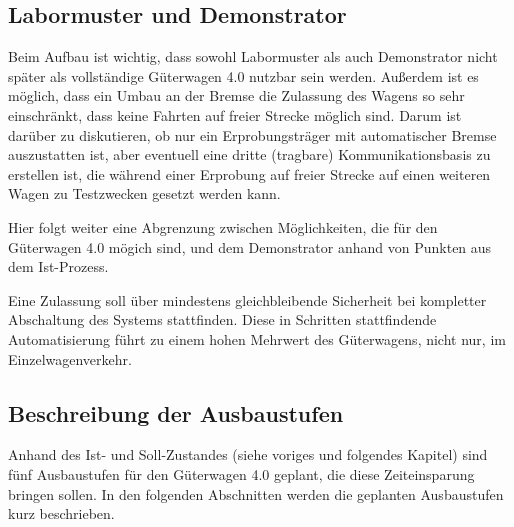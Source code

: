 \subsection{Labormuster und Demonstrator}
Beim Aufbau ist wichtig, dass sowohl Labormuster als auch Demonstrator nicht später als vollständige Güterwagen 4.0 nutzbar sein werden. Außerdem ist es möglich, dass ein Umbau an der Bremse die Zulassung des Wagens so sehr einschränkt, dass keine Fahrten auf freier Strecke möglich sind. Darum ist darüber zu diskutieren, ob nur ein Erprobungsträger mit automatischer Bremse auszustatten ist, aber eventuell eine dritte (tragbare) Kommunikationsbasis zu erstellen ist, die während einer Erprobung auf freier Strecke auf einen weiteren Wagen zu Testzwecken gesetzt werden kann.\par
Hier folgt weiter eine Abgrenzung zwischen Möglichkeiten, die für den Güterwagen 4.0  mögich sind, und dem Demonstrator anhand von Punkten aus dem Ist-Prozess.\par
Eine Zulassung soll über mindestens gleichbleibende Sicherheit bei kompletter Abschaltung des Systems stattfinden. Diese in Schritten stattfindende Automatisierung führt zu einem hohen Mehrwert des Güterwagens, nicht nur, im Einzelwagenverkehr.

\subsection{Beschreibung der Ausbaustufen}\label{sec:Ausbaustufen}
Anhand des Ist- und Soll-Zustandes (siehe voriges und folgendes Kapitel) sind fünf Ausbaustufen für den Güterwagen 4.0 geplant, die diese Zeiteinsparung bringen sollen. In den folgenden Abschnitten werden die geplanten Ausbaustufen kurz beschrieben.\par

